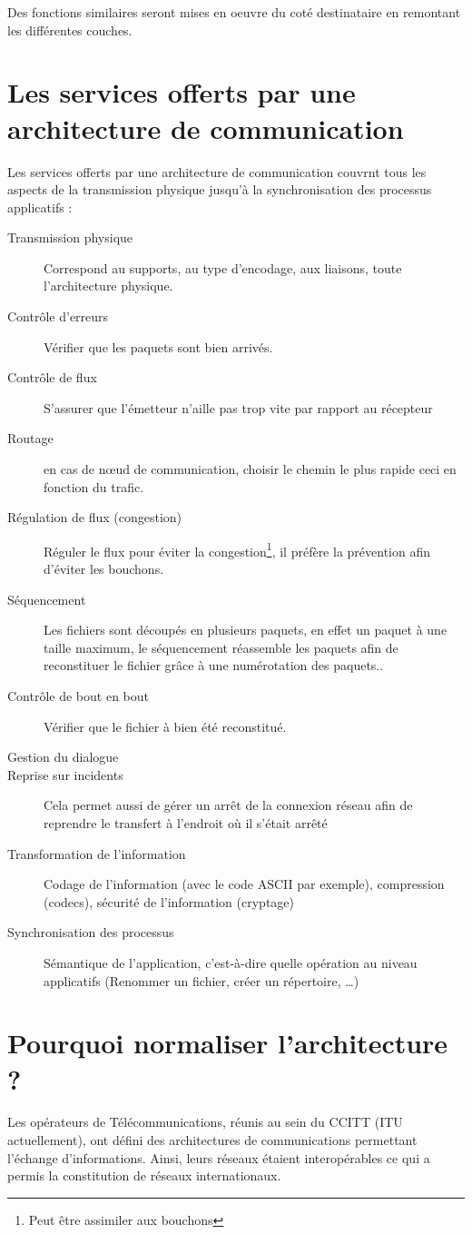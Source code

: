 Des fonctions similaires seront mises en oeuvre du coté destinataire en remontant les différentes couches.

\section{Les services offerts par une architecture de communication}
Les services offerts par une architecture de communication couvrnt tous les aspects de la transmission physique jusqu'à la synchronisation des processus applicatifs :
\begin{description}
	\item[Transmission physique] Correspond au supports, au type d'encodage, aux liaisons, toute l'architecture physique.
	\item[Contrôle d'erreurs]  Vérifier que les paquets sont bien arrivés.
	\item[Contrôle de flux]  S'assurer que l'émetteur n'aille pas trop vite par rapport au récepteur
	\item[Routage]  en cas de nœud de communication, choisir le chemin le plus rapide ceci en fonction du trafic. 
	\item[Régulation de flux (congestion)] Réguler le flux pour éviter la congestion\footnote{Peut être assimiler aux bouchons}, il préfère la prévention afin d'éviter les bouchons. 
	\item[Séquencement]  Les fichiers sont découpés en plusieurs paquets, en effet un paquet à une taille maximum, le séquencement réassemble les paquets afin de reconstituer le fichier grâce à une numérotation des paquets..
	\item[Contrôle de bout en bout] Vérifier que le fichier à bien été reconstitué. 
	\item[Gestion du dialogue] 
	\item[Reprise sur incidents]Cela permet aussi de gérer un arrêt de la connexion réseau afin de reprendre le transfert à l'endroit où il s'était arrêté
	\item[Transformation de l'information] Codage de l'information (avec le code ASCII par exemple), compression (codecs), sécurité de l'information (cryptage) 
	\item[Synchronisation des processus] Sémantique de l'application, c'est-à-dire quelle opération au niveau applicatifs (Renommer un fichier, créer un répertoire, \ldots)
\end{description}

\section{Pourquoi normaliser l'architecture ?}
Les opérateurs de Télécommunications, réunis au sein du CCITT (ITU actuellement), ont défini des architectures de communications permettant l'échange d'informations. Ainsi, leurs réseaux étaient interopérables ce qui a permis la constitution de réseaux internationaux.

